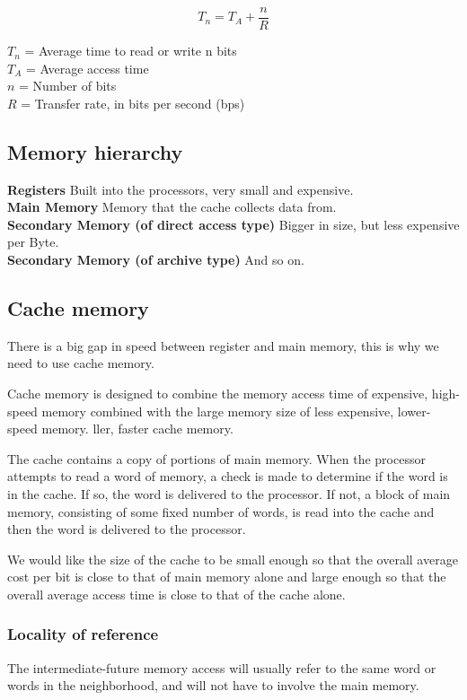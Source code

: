 $$T_n = T_A + \frac{n}{R}$$

$T_n$ = Average time to read or write n bits \\
$T_A$ = Average access time \\
$n$ = Number of bits \\
$R$ = Transfer rate, in bits per second (bps) \\

\subsection{Memory hierarchy}
\textbf{Registers} Built into the processors, very small and expensive. \\
\textbf{Main Memory} Memory that the cache collects data from. \\
\textbf{Secondary Memory (of direct access type)} Bigger in size, but less expensive per Byte. \\
\textbf{Secondary Memory (of archive type)} And so on. \\



\subsection{Cache memory}
There is a big gap in speed between register and main memory, this is why we need to use cache memory.

Cache memory is designed to combine the memory access time of expensive, high-speed memory combined with the large memory size of less expensive, lower-speed memory.
ller, faster cache memory.

The cache contains a copy of portions of main memory. When the processor attempts to read a word of memory, a check is made to determine if the word is in the cache. If so, the word is delivered to the processor. If not, a block of main memory, consisting of some fixed number of words, is read into the cache and then the word is delivered to the processor.

We would like the size of the cache to be small enough so that the overall average cost per bit is close to that of main memory alone and large enough so that the overall average access time is close to that of the cache alone.




\subsubsection{Locality of reference}
The intermediate-future memory access will usually refer to the same word or words in the neighborhood, and will not have to involve the main memory.

